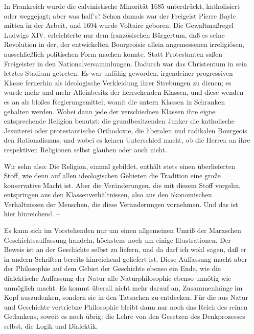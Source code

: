 In Frankreich wurde die calvinistische Minorität 1685
unterdrückt, katholisiert oder weggejagt; aber was half's? Schon damals
war der Freigeist Pierre Bayle mitten in der Arbeit, und 1694 wurde
Voltaire geboren. Die Gewaltmaßregel Ludwigs XIV. erleichterte nur dem
französischen Bürgertum, daß es seine Revolution in der, der
entwickelten Bourgeoisie allein angemessenen irreligiösen,
ausschließlich politischen Form machen konnte. Statt Protestanten saßen
Freigeister in den Nationalversammlungen. Dadurch war das Christentum in
sein letztes Stadium getreten. Es war unfähig geworden, irgendeiner
progressiven Klasse fernerhin als ideologische Verkleidung ihrer
Strebungen zu dienen; es wurde mehr und mehr Alleinbesitz der
herrschenden Klassen, und diese wenden es an als bloßes
Regierungsmittel, womit die untern Klassen in Schranken gehalten werden.
Wobei dann jede der verschiednen Klassen ihre eigne entsprechende
Religion benutzt: die grundbesitzenden Junker die katholische Jesuiterei
oder protestantische Orthodoxie, die liberalen und radikalen Bourgeois
den Rationalismus; und wobei es keinen Unterschied macht, ob die Herren
an ihre respektiven Religionen selbst glauben oder auch nicht.

Wir sehn also: Die Religion, einmal gebildet, enthält stets
einen überlieferten Stoff, wie denn auf allen ideologischen Gebieten die
Tradition eine große konservative Macht ist. Aber die Veränderungen, die
mit diesem Stoff vorgehn, entspringen aus den Klassenverhältnissen, also
aus den ökonomischen Verhältnissen der Menschen, die diese Veränderungen
vornehmen. Und das ist hier hinreichend. --

Es kann sich im Vorstehenden nur um einen allgemeinen Umriß der
Marxschen Geschichtsauffassung handeln, höchstens noch um einige
Illustrationen. Der Beweis ist an
der Geschichte selbst zu liefern, und da darf ich wohl sagen, daß er in
andern Schriften bereits hinreichend geliefert ist. Diese Auffassung
macht aber der Philosophie auf dem Gebiet der Geschichte ebenso ein
Ende, wie die dialektische Auffassung der Natur alle Naturphilosophie
ebenso unnötig wie unmöglich macht. Es kommt überall nicht mehr darauf
an, Zusammenhänge im Kopf auszudenken, sondern sie in den Tatsachen zu
entdecken. Für die aus Natur und Geschichte vertriebne Philosophie
bleibt dann nur noch das Reich des reinen Gedankens, soweit es noch
übrig: die Lehre von den Gesetzen des Denkprozesses selbst, die Logik
und Dialektik.

\asterisc

